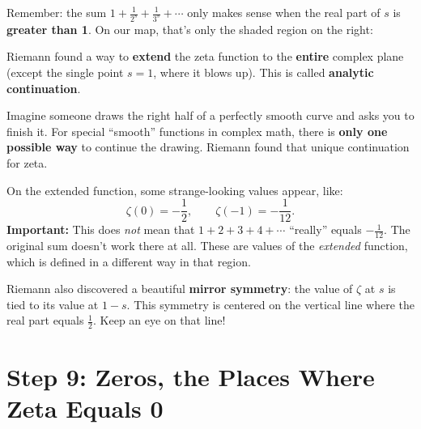 \documentclass[11pt,a4paper]{article}
\begin{document}
Remember: the sum $1 + \frac1{2^s} + \frac1{3^s} + \cdots$ only makes sense when the real part of $s$ is \textbf{greater than 1}. On our map, that's only the shaded region on the right:

\begin{center}
\end{center}

Riemann found a way to \textbf{extend} the zeta function to the \textbf{entire} complex plane (except the single point $s = 1$, where it blows up). This is called \textbf{analytic continuation}.

\begin{analogy}
Imagine someone draws the right half of a perfectly smooth curve and asks you to finish it. For special ``smooth'' functions in complex math, there is \textbf{only one possible way} to continue the drawing. Riemann found that unique continuation for zeta.
\end{analogy}

On the extended function, some strange-looking values appear, like:
\[
\zeta(0) = -\frac12, \qquad \zeta(-1) = -\frac1{12}.
\]
\textbf{Important:} This does \emph{not} mean that $1 + 2 + 3 + 4 + \cdots$ ``really'' equals $-\frac1{12}$. The original sum doesn't work there at all. These are values of the \emph{extended} function, which is defined in a different way in that region.

Riemann also discovered a beautiful \textbf{mirror symmetry}: the value of $\zeta$ at $s$ is tied to its value at $1 - s$. This symmetry is centered on the vertical line where the real part equals $\tfrac12$. Keep an eye on that line!

\section{Step 9: Zeros, the Places Where Zeta Equals 0}
\end{document}
